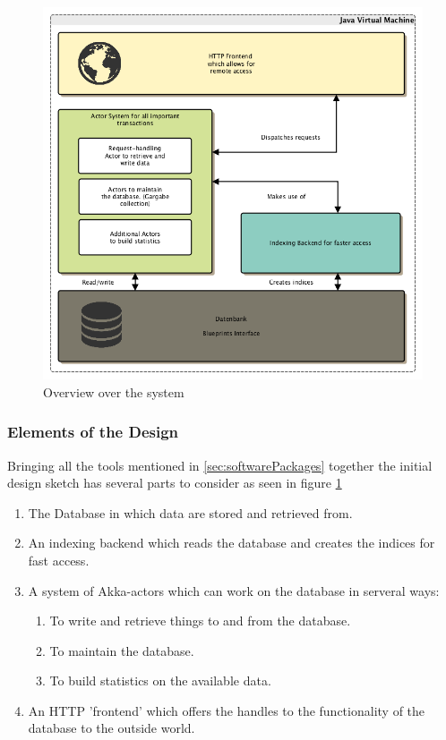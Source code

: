 \documentclass[twoside, 11pt]{scrartcl}
\begin{document}
\begin{figure}[h!]		
 	\includegraphics[scale=0.5]{figures/roughOverview.png}
	\caption{Overview over the system}
	\label{fig:roughOverview}
\end{figure}

\subsubsection{Elements of the Design}
Bringing all the  tools mentioned in \ref{sec:softwarePackages} together the initial design sketch has several parts to consider as seen in figure \ref{fig:roughOverview}

\begin{enumerate}
	\item The Database in which data are stored and retrieved from.
	\item An indexing backend which reads the database and creates the indices for fast access.
	\item A system of Akka-actors which can work on the database in serveral ways:
	\begin{enumerate}
		\item To write and retrieve things to and from the database.
		\item To maintain the database.
		\item To build statistics on the available data.		
	\end{enumerate}	
	\item An HTTP 'frontend' which offers the handles to the functionality of the database to the outside world.
\end{enumerate}
\end{document}
